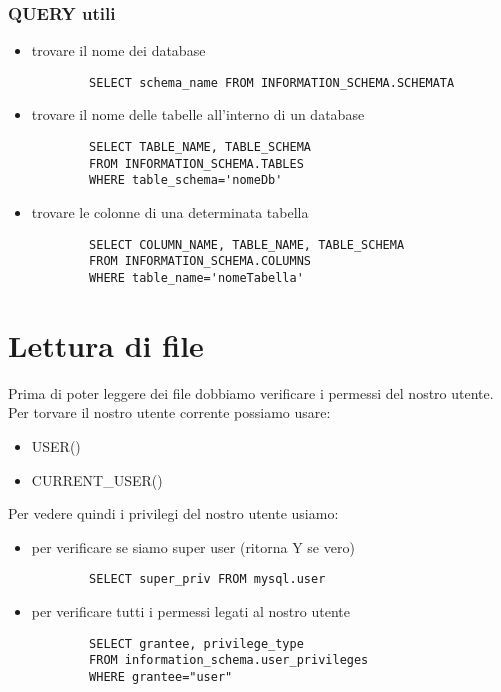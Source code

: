 \documentclass[oneside,a4paper,11pt]{book}
\theoremstyle{italicstyle}
\theoremstyle{normStyle}
\begin{document}
\subsubsection{QUERY utili}
\begin{itemize}
    \item trovare il nome dei database
    \begin{verbatim}
        SELECT schema_name FROM INFORMATION_SCHEMA.SCHEMATA
    \end{verbatim}
    \item trovare il nome delle tabelle all'interno di un database
    \begin{verbatim}
        SELECT TABLE_NAME, TABLE_SCHEMA 
        FROM INFORMATION_SCHEMA.TABLES 
        WHERE table_schema='nomeDb'
    \end{verbatim}
    \item trovare le colonne di una determinata tabella
    \begin{verbatim}
        SELECT COLUMN_NAME, TABLE_NAME, TABLE_SCHEMA 
        FROM INFORMATION_SCHEMA.COLUMNS 
        WHERE table_name='nomeTabella'
    \end{verbatim}
\end{itemize}

\section{Lettura di file}
Prima di poter leggere dei file dobbiamo verificare i permessi del nostro utente. Per torvare il nostro utente corrente possiamo usare:
\begin{itemize}
    \item USER()
    \item CURRENT\_USER()
\end{itemize}
Per vedere quindi i privilegi del nostro utente usiamo:
\begin{itemize}
    \item per verificare se siamo super user (ritorna Y se vero)
    \begin{verbatim}
        SELECT super_priv FROM mysql.user
    \end{verbatim}
    \item per verificare tutti i permessi legati al nostro utente
    \begin{verbatim}
        SELECT grantee, privilege_type 
        FROM information_schema.user_privileges 
        WHERE grantee="user"
    \end{verbatim}
\end{itemize}
\end{document}
